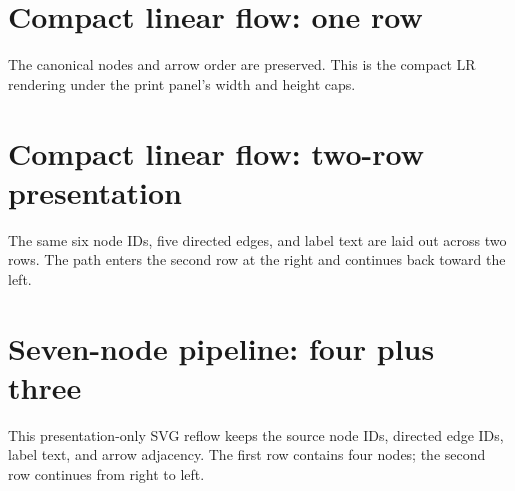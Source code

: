 \documentclass[11pt,twoside,openany]{book}
\begin{document}
\section*{Compact linear flow: one row}
The canonical nodes and arrow order are preserved. This is the compact LR rendering under the print panel's width and height caps.
\begin{center}\end{center}
\newpage
\section*{Compact linear flow: two-row presentation}
The same six node IDs, five directed edges, and label text are laid out across two rows. The path enters the second row at the right and continues back toward the left.
\begin{center}\end{center}
\newpage
\section*{Seven-node pipeline: four plus three}
This presentation-only SVG reflow keeps the source node IDs, directed edge IDs, label text, and arrow adjacency. The first row contains four nodes; the second row continues from right to left.
\begin{center}\end{center}
\end{document}
